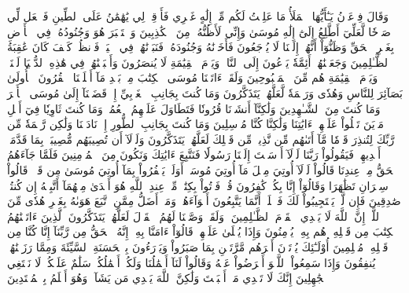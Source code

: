 وَقَالَ فِرۡعَوۡنُ يَـٰٓأَيُّهَا ٱلۡمَلَأُ مَا عَلِمۡتُ لَكُم مِّنۡ إِلَٰهٍ غَيۡرِي فَأَوۡقِدۡ لِي يَٰهَٰمَٰنُ عَلَى ٱلطِّينِ فَٱجۡعَل لِّي صَرۡحٗا لَّعَلِّيٓ أَطَّلِعُ إِلَىٰٓ إِلَٰهِ مُوسَىٰ وَإِنِّي لَأَظُنُّهُۥ مِنَ ٱلۡكَٰذِبِينَ
وَٱسۡتَكۡبَرَ هُوَ وَجُنُودُهُۥ فِي ٱلۡأَرۡضِ بِغَيۡرِ ٱلۡحَقِّ وَظَنُّوٓاْ أَنَّهُمۡ إِلَيۡنَا لَا يُرۡجَعُونَ
فَأَخَذۡنَٰهُ وَجُنُودَهُۥ فَنَبَذۡنَٰهُمۡ فِي ٱلۡيَمِّۖ فَٱنظُرۡ كَيۡفَ كَانَ عَٰقِبَةُ ٱلظَّـٰلِمِينَ
وَجَعَلۡنَٰهُمۡ أَئِمَّةٗ يَدۡعُونَ إِلَى ٱلنَّارِۖ وَيَوۡمَ ٱلۡقِيَٰمَةِ لَا يُنصَرُونَ
وَأَتۡبَعۡنَٰهُمۡ فِي هَٰذِهِ ٱلدُّنۡيَا لَعۡنَةٗۖ وَيَوۡمَ ٱلۡقِيَٰمَةِ هُم مِّنَ ٱلۡمَقۡبُوحِينَ
وَلَقَدۡ ءَاتَيۡنَا مُوسَى ٱلۡكِتَٰبَ مِنۢ بَعۡدِ مَآ أَهۡلَكۡنَا ٱلۡقُرُونَ ٱلۡأُولَىٰ بَصَآئِرَ لِلنَّاسِ وَهُدٗى وَرَحۡمَةٗ لَّعَلَّهُمۡ يَتَذَكَّرُونَ
وَمَا كُنتَ بِجَانِبِ ٱلۡغَرۡبِيِّ إِذۡ قَضَيۡنَآ إِلَىٰ مُوسَى ٱلۡأَمۡرَ وَمَا كُنتَ مِنَ ٱلشَّـٰهِدِينَ
وَلَٰكِنَّآ أَنشَأۡنَا قُرُونٗا فَتَطَاوَلَ عَلَيۡهِمُ ٱلۡعُمُرُۚ وَمَا كُنتَ ثَاوِيٗا فِيٓ أَهۡلِ مَدۡيَنَ تَتۡلُواْ عَلَيۡهِمۡ ءَايَٰتِنَا وَلَٰكِنَّا كُنَّا مُرۡسِلِينَ
وَمَا كُنتَ بِجَانِبِ ٱلطُّورِ إِذۡ نَادَيۡنَا وَلَٰكِن رَّحۡمَةٗ مِّن رَّبِّكَ لِتُنذِرَ قَوۡمٗا مَّآ أَتَىٰهُم مِّن نَّذِيرٖ مِّن قَبۡلِكَ لَعَلَّهُمۡ يَتَذَكَّرُونَ
وَلَوۡلَآ أَن تُصِيبَهُم مُّصِيبَةُۢ بِمَا قَدَّمَتۡ أَيۡدِيهِمۡ فَيَقُولُواْ رَبَّنَا لَوۡلَآ أَرۡسَلۡتَ إِلَيۡنَا رَسُولٗا فَنَتَّبِعَ ءَايَٰتِكَ وَنَكُونَ مِنَ ٱلۡمُؤۡمِنِينَ
فَلَمَّا جَآءَهُمُ ٱلۡحَقُّ مِنۡ عِندِنَا قَالُواْ لَوۡلَآ أُوتِيَ مِثۡلَ مَآ أُوتِيَ مُوسَىٰٓۚ أَوَلَمۡ يَكۡفُرُواْ بِمَآ أُوتِيَ مُوسَىٰ مِن قَبۡلُۖ قَالُواْ سِحۡرَانِ تَظَٰهَرَا وَقَالُوٓاْ إِنَّا بِكُلّٖ كَٰفِرُونَ
قُلۡ فَأۡتُواْ بِكِتَٰبٖ مِّنۡ عِندِ ٱللَّهِ هُوَ أَهۡدَىٰ مِنۡهُمَآ أَتَّبِعۡهُ إِن كُنتُمۡ صَٰدِقِينَ
فَإِن لَّمۡ يَسۡتَجِيبُواْ لَكَ فَٱعۡلَمۡ أَنَّمَا يَتَّبِعُونَ أَهۡوَآءَهُمۡۚ وَمَنۡ أَضَلُّ مِمَّنِ ٱتَّبَعَ هَوَىٰهُ بِغَيۡرِ هُدٗى مِّنَ ٱللَّهِۚ إِنَّ ٱللَّهَ لَا يَهۡدِي ٱلۡقَوۡمَ ٱلظَّـٰلِمِينَ
۞وَلَقَدۡ وَصَّلۡنَا لَهُمُ ٱلۡقَوۡلَ لَعَلَّهُمۡ يَتَذَكَّرُونَ
ٱلَّذِينَ ءَاتَيۡنَٰهُمُ ٱلۡكِتَٰبَ مِن قَبۡلِهِۦ هُم بِهِۦ يُؤۡمِنُونَ
وَإِذَا يُتۡلَىٰ عَلَيۡهِمۡ قَالُوٓاْ ءَامَنَّا بِهِۦٓ إِنَّهُ ٱلۡحَقُّ مِن رَّبِّنَآ إِنَّا كُنَّا مِن قَبۡلِهِۦ مُسۡلِمِينَ
أُوْلَـٰٓئِكَ يُؤۡتَوۡنَ أَجۡرَهُم مَّرَّتَيۡنِ بِمَا صَبَرُواْ وَيَدۡرَءُونَ بِٱلۡحَسَنَةِ ٱلسَّيِّئَةَ وَمِمَّا رَزَقۡنَٰهُمۡ يُنفِقُونَ
وَإِذَا سَمِعُواْ ٱللَّغۡوَ أَعۡرَضُواْ عَنۡهُ وَقَالُواْ لَنَآ أَعۡمَٰلُنَا وَلَكُمۡ أَعۡمَٰلُكُمۡ سَلَٰمٌ عَلَيۡكُمۡ لَا نَبۡتَغِي ٱلۡجَٰهِلِينَ
إِنَّكَ لَا تَهۡدِي مَنۡ أَحۡبَبۡتَ وَلَٰكِنَّ ٱللَّهَ يَهۡدِي مَن يَشَآءُۚ وَهُوَ أَعۡلَمُ بِٱلۡمُهۡتَدِينَ
